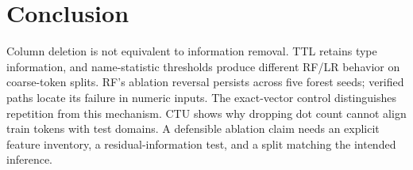 \documentclass[conference]{IEEEtran}
\begin{document}
\section{Conclusion}
Column deletion is not equivalent to information removal. TTL retains type information, and name-statistic thresholds produce different RF/LR behavior on coarse-token splits. RF's ablation reversal persists across five forest seeds; verified paths locate its failure in numeric inputs. The exact-vector control distinguishes repetition from this mechanism. CTU shows why dropping dot count cannot align train tokens with test domains. A defensible ablation claim needs an explicit feature inventory, a residual-information test, and a split matching the intended inference.


\end{document}
